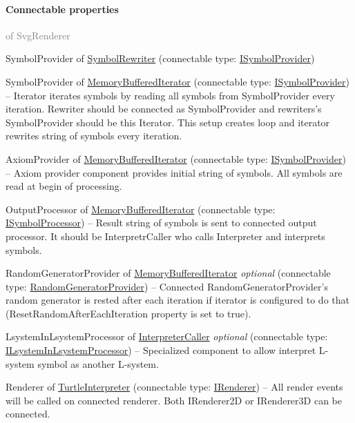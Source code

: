 	\paragraph{Connectable properties}\textcolor{gray}{of SvgRenderer}
	\begin{description*}
		\item[SymbolProvider] of \hyperref[Malsys.Processing.Components.Rewriters.SymbolRewriter]{SymbolRewriter}
		(connectable type: \hyperref[Malsys.Processing.Components.ISymbolProvider]{ISymbolProvider})
		\item[SymbolProvider] of \hyperref[Malsys.Processing.Components.RewriterIterators.MemoryBufferedIterator]{MemoryBufferedIterator}
		(connectable type: \hyperref[Malsys.Processing.Components.ISymbolProvider]{ISymbolProvider})
			-- Iterator iterates symbols by reading all symbols from SymbolProvider every iteration.
            Rewriter should be connected as SymbolProvider and rewriters's SymbolProvider should be this Iterator.
            This setup creates loop and iterator rewrites string of symbols every iteration.
		\item[AxiomProvider] of \hyperref[Malsys.Processing.Components.RewriterIterators.MemoryBufferedIterator]{MemoryBufferedIterator}
		(connectable type: \hyperref[Malsys.Processing.Components.ISymbolProvider]{ISymbolProvider})
			-- Axiom provider component provides initial string of symbols.
            All symbols are read at begin of processing.
		\item[OutputProcessor] of \hyperref[Malsys.Processing.Components.RewriterIterators.MemoryBufferedIterator]{MemoryBufferedIterator}
		(connectable type: \hyperref[Malsys.Processing.Components.ISymbolProcessor]{ISymbolProcessor})
			-- Result string of symbols is sent to connected output processor.
            It should be InterpretrCaller who calls Interpreter and interprets symbols.
		\item[RandomGeneratorProvider] of \hyperref[Malsys.Processing.Components.RewriterIterators.MemoryBufferedIterator]{MemoryBufferedIterator}
 \textit{optional} 		(connectable type: \hyperref[Malsys.Processing.Components.Common.RandomGeneratorProvider]{RandomGeneratorProvider})
			-- Connected RandomGeneratorProvider's random generator is rested after each iteration
            if iterator is configured to do that (ResetRandomAfterEachIteration property is set to true).
		\item[LsystemInLsystemProcessor] of \hyperref[Malsys.Processing.Components.Interpreters.InterpreterCaller]{InterpreterCaller}
 \textit{optional} 		(connectable type: \hyperref[Malsys.Processing.Components.Common.ILsystemInLsystemProcessor]{ILsystemInLsystemProcessor})
			-- Specialized component to allow interpret L-system symbol as another L-system.
		\item[Renderer] of \hyperref[Malsys.Processing.Components.Interpreters.TurtleInterpreter]{TurtleInterpreter}
		(connectable type: \hyperref[Malsys.Processing.Components.IRenderer]{IRenderer})
			-- All render events will be called on connected renderer.
            Both IRenderer2D or IRenderer3D can be connected.
	\end{description*}
